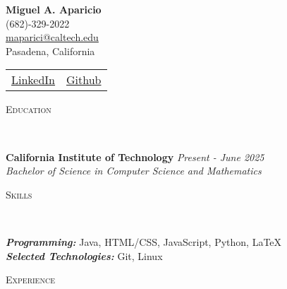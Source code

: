 \documentclass[letterpaper,11pt]{article}
\newcommand{\lineover}{
	\begin{changemargin}{-0.05in}{-0.05in}
		\vspace*{-8pt}
		\hrulefill \\
		\vspace*{-2pt}
	\end{changemargin}
}
\newenvironment{changemargin}[2]{%
  \begin{list}{}{%
    \setlength{\topsep}{0pt}%
    \setlength{\leftmargin}{0}%
    \setlength{\rightmargin}{#2}%
    \setlength{\listparindent}{\parindent}%
    \setlength{\itemindent}{\parindent}%
    \setlength{\parsep}{\parskip}%
  }%
  \item[]}{\end{list}
}
\newcommand{\header}[1]{
	\begin{changemargin}{-0.5in}{-0.5in}
		\scshape{#1}\\
  	\lineover
	\end{changemargin}
}
\newenvironment{body} {
	\vspace*{-16pt}
	\begin{changemargin}{-0.25in}{-0.5in}
  }	
	{\end{changemargin}
}
\begin{document}


{\Large \textbf{Miguel A. Aparicio}} \\
(682)-329-2022 \\
\href{mailto:maparici@caltech.edu}{maparici@caltech.edu} \\
 Pasadena, California \\
 \begin{tabular}{l|l}
\href{https://www.linkedin.com/in/miguel-angel-aparicio-9a681a1a3/}{LinkedIn } & \href{https://github.com/jar0ch0}{ Github} 
\end{tabular}
\medskip

\header{Education}

\begin{body}
	\vspace{14pt}
	\textbf{California Institute of Technology} \hfill \emph{Present - June 2025} \\
	\emph{Bachelor of Science in Computer Science and Mathematics}\\
	
\end{body}

\medskip
\medskip

\header{Skills}

\begin{body}
	\vspace{14pt}
	\emph{\textbf{Programming:}}{} Java, HTML/CSS, JavaScript, Python, \LaTeX\\
	\medskip
	\emph{\textbf{Selected Technologies:}}{} Git, Linux\\
\end{body}

\medskip


\header{Experience}
\end{document}
